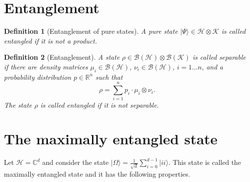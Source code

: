 \documentclass{article}
\newtheorem{definition}{Definition}
\theoremstyle{definition}
\newcommand{\ket}[1]{\vert #1 \rangle}
\newcommand{\bounded}[1]{\mathcal{B}(#1)}
\begin{document}
\section{Entanglement}

\begin{definition}[Entanglement of pure states]
  A pure state $\ket{\Psi}\in \mathcal{H}\otimes\mathcal{K}$ is called entangled if it is not a product.
\end{definition}

\begin{definition}[Entanglement]
  A state $\rho \in \bounded{\mathcal{H}} \otimes \bounded{\mathcal{K}}$ is called \emph{separable} if there are density matrices $\mu_i\in \bounded{\mathcal{H}}$, $\nu_i\in\bounded{\mathcal{H}}$, $i=1\dots n$, and a probability distribution $p\in\mathbb{R}^n$ such that
  \begin{equation*}
    \rho = \sum_{i=1}^n p_i \cdot \mu_i \otimes \nu_i.    
  \end{equation*}
  The state $\rho$ is called \emph{entangled} if it is not separable.
\end{definition}

\section{The maximally entangled state}

Let $\mathcal{H} = \mathbb{C}^d$ and consider the state $\ket{\Omega} = \frac{1}{\sqrt{d}}\sum_{i=0}^{d-1} \ket{ii}$. This state is called the maximally entangled state and it has the following properties.
\end{document}
